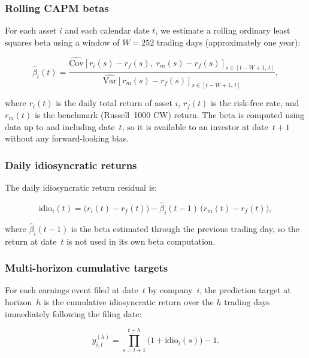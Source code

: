 \documentclass{article}
\begin{document}
\subsubsection{Rolling CAPM betas}

For each asset $i$ and each calendar date $t$, we estimate a rolling ordinary least squares beta using a window of $W = 252$ trading days (approximately one year):

\begin{equation}
\hat{\beta}_i(t)
= \frac{\widehat{\mathrm{Cov}}\!\left[r_i(s) - r_f(s),\; r_m(s) - r_f(s)\right]_{s \in [t-W+1,\,t]}}
       {\widehat{\mathrm{Var}}\!\left[r_m(s) - r_f(s)\right]_{s \in [t-W+1,\,t]}},
\end{equation}

where $r_i(t)$ is the daily total return of asset $i$, $r_f(t)$ is the risk-free rate, and $r_m(t)$ is the benchmark (Russell~1000 CW) return. The beta is computed using data up to and including date~$t$, so it is available to an investor at date~$t+1$ without any forward-looking bias.

\subsubsection{Daily idiosyncratic returns}

The daily idiosyncratic return residual is:

\begin{equation}
\mathrm{idio}_i(t)
= \bigl(r_i(t) - r_f(t)\bigr)
  - \hat{\beta}_i(t-1)\,\bigl(r_m(t) - r_f(t)\bigr),
\end{equation}

where $\hat{\beta}_i(t-1)$ is the beta estimated through the previous trading day, so the return at date~$t$ is not used in its own beta computation.

\subsubsection{Multi-horizon cumulative targets}

For each earnings event filed at date~$t$ by company~$i$, the prediction target at horizon~$h$ is the cumulative idiosyncratic return over the $h$ trading days immediately following the filing date:

\begin{equation}
y^{(h)}_{i,t}
= \prod_{s=t+1}^{t+h} \bigl(1 + \mathrm{idio}_i(s)\bigr) - 1.
\end{equation}
\end{document}
